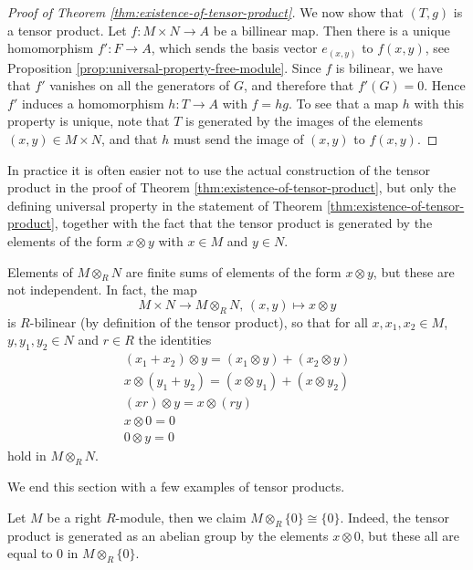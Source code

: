 \begin{proof}[Proof of Theorem \ref{thm:existence-of-tensor-product}]
We now show that $(T,g)$ is a tensor product. Let $f\colon M\times N \to A$ be a billinear map. Then there is a unique homomorphism
$f' \colon F \to A$, which sends the basis vector $e_{(x,y)}$ to $f(x,y)$, see Proposition \ref{prop:universal-property-free-module}.
Since $f$ is bilinear, we have that $f'$ vanishes on all the generators of $G$, and therefore that $f'(G)=0$. Hence $f'$ induces a homomorphism $h\colon T \to A$ with $f=hg$. To see that a map $h$ with this property is unique, note that $T$ is generated by the images of the elements $(x,y)\in M\times N$, and that $h$ must send the image of $(x,y)$ to $f(x,y)$.
\end{proof}


\begin{remark}
In practice it is often easier not to use the actual construction of the tensor product in the proof of Theorem \ref{thm:existence-of-tensor-product}, but only the defining universal property in the statement of Theorem  \ref{thm:existence-of-tensor-product}, together with the fact that the tensor product is generated by the elements of the form $x\otimes y$ with $x\in M$ and $y\in N$.
\end{remark}

\begin{remark}
Elements of $M\otimes_R N$ are finite sums of elements of the form $x\otimes y$, but these are not independent. In fact, 
the map
\[
	M\times N \to M\otimes_R N,\, (x,y) \mapsto x\otimes y
\]
is $R$-bilinear (by definition of the tensor product), so that for all  $x, x_1,x_2\in M$, $y,y_1,y_2\in N$ and $r\in R$  the identities
\begin{gather*}
	(x_1+x_2) \otimes y = (x_1 \otimes y) + (x_2 \otimes y) \\
	x\otimes (y_1+y_2) = (x \otimes y_1) + (x \otimes y_2) \\
	(xr) \otimes y = x \otimes (ry) \\
	x \otimes 0 = 0 \\
	0 \otimes y = 0 
\end{gather*}
hold in $M\otimes_R N$. 
\end{remark}


We end this section with a few examples of tensor products.

\begin{example}
Let $M$ be a right $R$-module, then we claim $M \otimes_R \{0\} \cong \{0\}$. Indeed, the tensor product is generated as an abelian group by the elements $x\otimes 0$, but these all are equal to $0$ in $M\otimes_R \{0\}$. 
\end{example}


